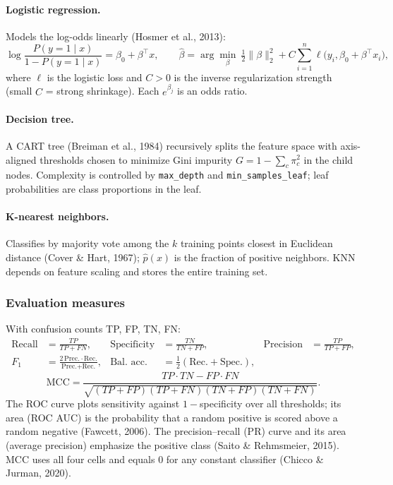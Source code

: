 \documentclass[12pt,a4paper]{article}
\newcommand{\code}[1]{\texttt{\small #1}}
\begin{document}
\paragraph{Logistic regression.} Models the log-odds linearly (Hosmer et al., 2013):
\begin{equation}
\log\frac{P(y=1\mid x)}{1-P(y=1\mid x)}=\beta_0+\beta^\top x,\qquad
\hat\beta=\arg\min_{\beta}\ \tfrac12\|\beta\|_2^2+C\sum_{i=1}^{n}\ell\big(y_i,\beta_0+\beta^\top x_i\big),
\end{equation}
where $\ell$ is the logistic loss and $C>0$ is the inverse regularization strength (small $C$ = strong shrinkage). Each $e^{\beta_j}$ is an odds ratio.

\paragraph{Decision tree.} A CART tree (Breiman et al., 1984) recursively splits the feature space with axis-aligned thresholds chosen to minimize Gini impurity $G=1-\sum_c \pi_c^2$ in the child nodes. Complexity is controlled by \code{max\_depth} and \code{min\_samples\_leaf}; leaf probabilities are class proportions in the leaf.

\paragraph{K-nearest neighbors.} Classifies by majority vote among the $k$ training points closest in Euclidean distance (Cover \& Hart, 1967); $\hat p(x)$ is the fraction of positive neighbors. KNN depends on feature scaling and stores the entire training set.

\subsubsection{Evaluation measures}
With confusion counts TP, FP, TN, FN:
\begin{align*}
\text{Recall}&=\tfrac{TP}{TP+FN}, & \text{Specificity}&=\tfrac{TN}{TN+FP}, & \text{Precision}&=\tfrac{TP}{TP+FP},\\
F_1&=\tfrac{2\,\text{Prec.}\cdot\text{Rec.}}{\text{Prec.}+\text{Rec.}}, & \text{Bal.\ acc.}&=\tfrac12(\text{Rec.}+\text{Spec.}), & &
\end{align*}
\[\text{MCC}=\frac{TP\cdot TN-FP\cdot FN}{\sqrt{(TP{+}FP)(TP{+}FN)(TN{+}FP)(TN{+}FN)}}.\]
The ROC curve plots sensitivity against $1-$specificity over all thresholds; its area (ROC AUC) is the probability that a random positive is scored above a random negative (Fawcett, 2006). The precision--recall (PR) curve and its area (average precision) emphasize the positive class (Saito \& Rehmsmeier, 2015). MCC uses all four cells and equals $0$ for any constant classifier (Chicco \& Jurman, 2020).
\end{document}

